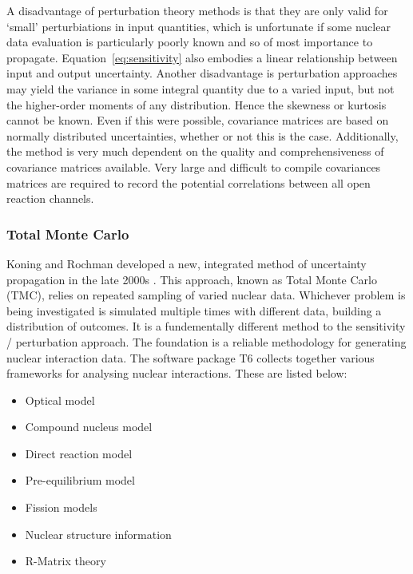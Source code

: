 A disadvantage of perturbation theory methods is that they are only valid for `small' perturbiations in input quantities, which is unfortunate if some nuclear data evaluation is particularly poorly known and so of most importance to propagate. Equation~\ref{eq:sensitivity} also embodies a linear relationship between input and output uncertainty. Another disadvantage is perturbation approaches may yield the variance in some integral quantity due to a varied input, but not the higher-order moments of any distribution. Hence the skewness or kurtosis cannot be known. Even if this were possible, covariance matrices are based on normally distributed uncertainties, whether or not this is the case. Additionally, the method is very much dependent on the quality and comprehensiveness of covariance matrices available. Very large and difficult to compile covariances matrices are required to record the potential correlations between all open reaction channels. 


\subsubsection{Total Monte Carlo}
Koning and Rochman developed a new, integrated method of uncertainty propagation in the late 2000s \cite{Koning2008}. This approach, known as Total Monte Carlo (TMC), relies on repeated sampling of varied nuclear data. Whichever problem is being investigated is simulated multiple times with different data, building a distribution of outcomes. It is a fundementally different method to the sensitivity / perturbation approach. The foundation is a reliable methodology for generating nuclear interaction data. The software package T6 \cite{Koning2005} collects together various frameworks for analysing nuclear interactions. These are listed below:

\begin{itemize}
  \item Optical model
  \item Compound nucleus model
  \item Direct reaction model
  \item Pre-equilibrium model
  \item Fission models
  \item Nuclear structure information
  \item R-Matrix theory
\end{itemize}

